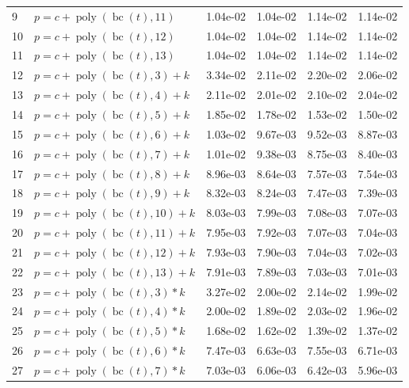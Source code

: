 \documentclass[12pt,a4paper]{article}
\DeclareMathOperator{\bc}{bc}
\DeclareMathOperator{\poly}{poly}
\begin{document}
\begin{longtable}[t]{ll>{\raggedleft\arraybackslash}p{2cm}>{\raggedleft\arraybackslash}p{2cm}>{\raggedleft\arraybackslash}p{2cm}>{\raggedleft\arraybackslash}p{2cm}}
\rowcolor{gray!6}  9 & $p = c + \poly\left( \bc(t), 11 \right)$ & 1.04e-02 & 1.04e-02 & 1.14e-02 & 1.14e-02\\
10 & $p = c + \poly\left( \bc(t), 12 \right)$ & 1.04e-02 & 1.04e-02 & 1.14e-02 & 1.14e-02\\
\rowcolor{gray!6}  11 & $p = c + \poly\left( \bc(t), 13 \right)$ & 1.04e-02 & 1.04e-02 & 1.14e-02 & 1.14e-02\\
12 & $p = c + \poly\left( \bc(t), 3 \right) + k$ & 3.34e-02 & 2.11e-02 & 2.20e-02 & 2.06e-02\\
\rowcolor{gray!6}  13 & $p = c + \poly\left( \bc(t), 4 \right) + k$ & 2.11e-02 & 2.01e-02 & 2.10e-02 & 2.04e-02\\
14 & $p = c + \poly\left( \bc(t), 5 \right) + k$ & 1.85e-02 & 1.78e-02 & 1.53e-02 & 1.50e-02\\
\rowcolor{gray!6}  15 & $p = c + \poly\left( \bc(t), 6 \right) + k$ & 1.03e-02 & 9.67e-03 & 9.52e-03 & 8.87e-03\\
16 & $p = c + \poly\left( \bc(t), 7 \right) + k$ & 1.01e-02 & 9.38e-03 & 8.75e-03 & 8.40e-03\\
\rowcolor{gray!6}  17 & $p = c + \poly\left( \bc(t), 8 \right) + k$ & 8.96e-03 & 8.64e-03 & 7.57e-03 & 7.54e-03\\
18 & $p = c + \poly\left( \bc(t), 9 \right) + k$ & 8.32e-03 & 8.24e-03 & 7.47e-03 & 7.39e-03\\
\rowcolor{gray!6}  19 & $p = c + \poly\left( \bc(t), 10 \right) + k$ & 8.03e-03 & 7.99e-03 & 7.08e-03 & 7.07e-03\\
20 & $p = c + \poly\left( \bc(t), 11 \right) + k$ & 7.95e-03 & 7.92e-03 & 7.07e-03 & 7.04e-03\\
\rowcolor{gray!6}  21 & $p = c + \poly\left( \bc(t), 12 \right) + k$ & 7.93e-03 & 7.90e-03 & 7.04e-03 & 7.02e-03\\
22 & $p = c + \poly\left( \bc(t), 13 \right) + k$ & 7.91e-03 & 7.89e-03 & 7.03e-03 & 7.01e-03\\
\rowcolor{gray!6}  23 & $p = c + \poly\left( \bc(t), 3 \right) * k$ & 3.27e-02 & 2.00e-02 & 2.14e-02 & 1.99e-02\\
24 & $p = c + \poly\left( \bc(t), 4 \right) * k$ & 2.00e-02 & 1.89e-02 & 2.03e-02 & 1.96e-02\\
\rowcolor{gray!6}  25 & $p = c + \poly\left( \bc(t), 5 \right) * k$ & 1.68e-02 & 1.62e-02 & 1.39e-02 & 1.37e-02\\
26 & $p = c + \poly\left( \bc(t), 6 \right) * k$ & 7.47e-03 & 6.63e-03 & 7.55e-03 & 6.71e-03\\
\rowcolor{gray!6}  27 & $p = c + \poly\left( \bc(t), 7 \right) * k$ & 7.03e-03 & 6.06e-03 & 6.42e-03 & 5.96e-03\\

\end{longtable}
\end{document}
